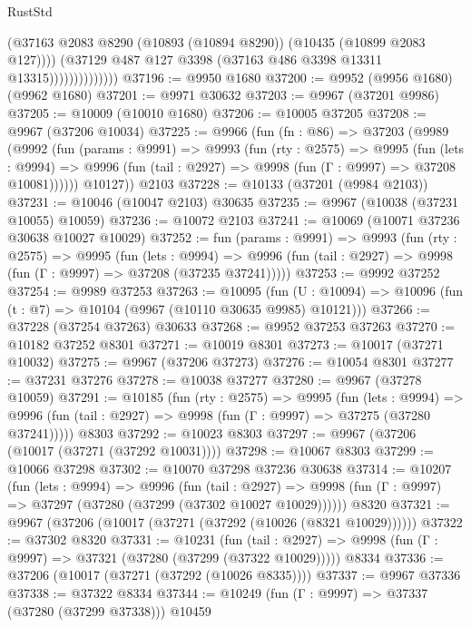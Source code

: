 \begin{lexlean}{RustStd}
\begin{coremodule}
                              (@37163
                                @2083
                                @8290
                                (@10893 (@10894 @8290))
                                (@10435 (@10899 @2083 @127))))
                            (@37129 @487 @127 @3398 (@37163 @486 @3398 @13311 @13315))))))))))))))
@37196 := @9950 @1680
@37200 := @9952 (@9956 @1680) (@9962 @1680)
@37201 := @9971 @30632
@37203 := @9967 (@37201 @9986)
@37205 := @10009 (@10010 @1680)
@37206 := @10005 @37205
@37208 := @9967 (@37206 @10034)
@37225 := @9966
    (fun (fn : @86) =>
    @37203
      (@9989
        (@9992
          (fun (params : @9991) =>
          @9993
            (fun (rty : @2575) =>
            @9995
              (fun (lets : @9994) =>
              @9996 (fun (tail : @2927) => @9998 (fun (Γ : @9997) => @37208 @10081))))))
        @10127))
    @2103
@37228 := @10133 (@37201 (@9984 @2103))
@37231 := @10046 (@10047 @2103) @30635
@37235 := @9967 (@10038 (@37231 @10055) @10059)
@37236 := @10072 @2103
@37241 := @10069 (@10071 @37236 @30638 @10027 @10029)
@37252 := fun (params : @9991) =>
  @9993
    (fun (rty : @2575) =>
    @9995
      (fun (lets : @9994) =>
      @9996 (fun (tail : @2927) => @9998 (fun (Γ : @9997) => @37208 (@37235 @37241)))))
@37253 := @9992 @37252
@37254 := @9989 @37253
@37263 := @10095
    (fun (U : @10094) => @10096 (fun (t : @7) => @10104 (@9967 (@10110 @30635 @9985) @10121)))
@37266 := @37228 (@37254 @37263) @30633
@37268 := @9952 @37253 @37263
@37270 := @10182 @37252 @8301
@37271 := @10019 @8301
@37273 := @10017 (@37271 @10032)
@37275 := @9967 (@37206 @37273)
@37276 := @10054 @8301
@37277 := @37231 @37276
@37278 := @10038 @37277
@37280 := @9967 (@37278 @10059)
@37291 := @10185
    (fun (rty : @2575) =>
    @9995
      (fun (lets : @9994) =>
      @9996 (fun (tail : @2927) => @9998 (fun (Γ : @9997) => @37275 (@37280 @37241)))))
    @8303
@37292 := @10023 @8303
@37297 := @9967 (@37206 (@10017 (@37271 (@37292 @10031))))
@37298 := @10067 @8303
@37299 := @10066 @37298
@37302 := @10070 @37298 @37236 @30638
@37314 := @10207
    (fun (lets : @9994) =>
    @9996
      (fun (tail : @2927) =>
      @9998 (fun (Γ : @9997) => @37297 (@37280 (@37299 (@37302 @10027 @10029))))))
    @8320
@37321 := @9967 (@37206 (@10017 (@37271 (@37292 (@10026 (@8321 @10029))))))
@37322 := @37302 @8320
@37331 := @10231
    (fun (tail : @2927) => @9998 (fun (Γ : @9997) => @37321 (@37280 (@37299 (@37322 @10029)))))
    @8334
@37336 := @37206 (@10017 (@37271 (@37292 (@10026 @8335))))
@37337 := @9967 @37336
@37338 := @37322 @8334
@37344 := @10249 (fun (Γ : @9997) => @37337 (@37280 (@37299 @37338))) @10459

\end{coremodule}
\end{lexlean}
